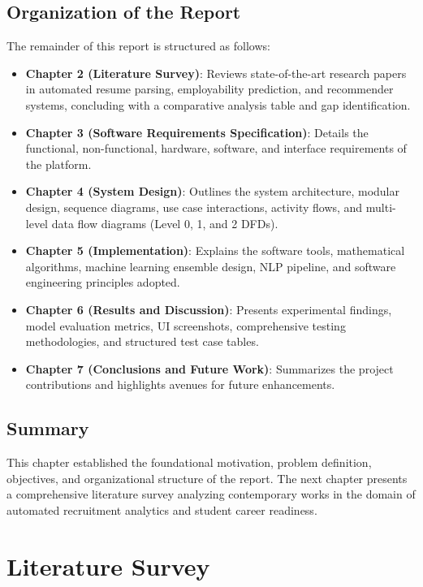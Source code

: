 \documentclass[12pt,a4paper]{report}
\begin{document}
\section{Organization of the Report}
The remainder of this report is structured as follows:
\begin{itemize}
    \item \textbf{Chapter 2 (Literature Survey)}: Reviews state-of-the-art research papers in automated resume parsing, employability prediction, and recommender systems, concluding with a comparative analysis table and gap identification.
    \item \textbf{Chapter 3 (Software Requirements Specification)}: Details the functional, non-functional, hardware, software, and interface requirements of the platform.
    \item \textbf{Chapter 4 (System Design)}: Outlines the system architecture, modular design, sequence diagrams, use case interactions, activity flows, and multi-level data flow diagrams (Level 0, 1, and 2 DFDs).
    \item \textbf{Chapter 5 (Implementation)}: Explains the software tools, mathematical algorithms, machine learning ensemble design, NLP pipeline, and software engineering principles adopted.
    \item \textbf{Chapter 6 (Results and Discussion)}: Presents experimental findings, model evaluation metrics, UI screenshots, comprehensive testing methodologies, and structured test case tables.
    \item \textbf{Chapter 7 (Conclusions and Future Work)}: Summarizes the project contributions and highlights avenues for future enhancements.
\end{itemize}

\section{Summary}
This chapter established the foundational motivation, problem definition, objectives, and organizational structure of the report. The next chapter presents a comprehensive literature survey analyzing contemporary works in the domain of automated recruitment analytics and student career readiness.


\chapter{Literature Survey}
\end{document}
